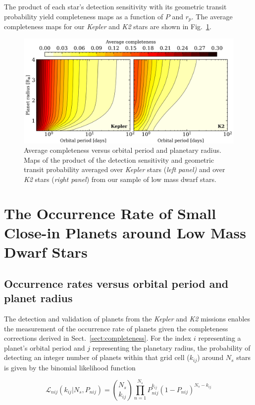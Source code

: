 \documentclass[twocolumn]{emulateapj}
\newcommand{\kepler}[1]{\emph{Kepler}#1}
\newcommand{\ktwo}[1]{\emph{K2}#1}
\begin{document}
The product of each star's detection sensitivity with its geometric transit probability yield completeness
maps as a function of $P$ and $r_p$. The average completeness maps for our \kepler{} and \ktwo{} stars are
shown in Fig.~\ref{fig:compmap}.

\begin{figure}
  \centering
  \includegraphics[width=0.98\hsize]{figures/compmap.png}
  \caption{Average completeness versus orbital period and planetary radius.
    Maps of the product of the detection sensitivity and geometric transit probability averaged over \kepler{} stars
    (\emph{left panel)} and over \ktwo{} stars (\emph{right panel}) from our sample of low mass dwarf stars.} 
  \label{fig:compmap}
\end{figure}


\section{The Occurrence Rate of Small Close-in Planets around Low Mass Dwarf Stars} \label{sect:occurrence}
\subsection{Occurrence rates versus orbital period and planet radius}
The detection and validation of planets from the \kepler{} and \ktwo{} missions enables the measurement of the
occurrence rate of planets given the completeness corrections derived in Sect.~\ref{sect:completeness}.
For the index $i$ representing a planet's orbital period and $j$ representing the planetary
radius, the probability of detecting an integer number of planets within that grid cell ($k_{ij}$) around
$N_s$ stars is given by the binomial likelihood function

\begin{equation}
  \mathcal{L}_{nij}(k_{ij}|N_s,P_{nij}) = \binom{N_s}{k_{ij}} \prod_{n=1}^{N_s} P_{nij}^{k_{ij}} (1-P_{nij})^{N_s-k_{ij}}
  \label{eq:lnL}
\end{equation}
\end{document}
